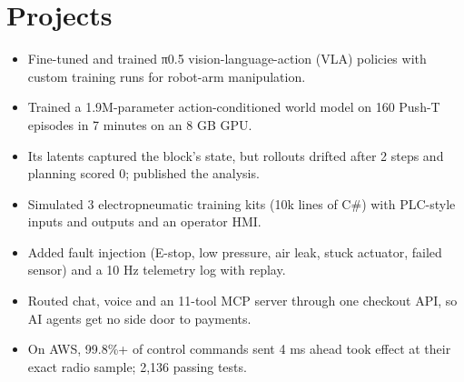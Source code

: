 \documentclass[10pt]{article}
\begin{document}
\section{Projects}
\begin{itemize}
\item Fine-tuned and trained π0.5 vision-language-action (VLA) policies with custom training runs for robot-arm manipulation.
\end{itemize}
\begin{itemize}
\item Trained a 1.9M-parameter action-conditioned world model on 160 Push-T episodes in 7 minutes on an 8 GB GPU.
\item Its latents captured the block's state, but rollouts drifted after 2 steps and planning scored 0; published the analysis.
\end{itemize}
\begin{itemize}
\item Simulated 3 electropneumatic training kits (10k lines of C\#) with PLC-style inputs and outputs and an operator HMI.
\item Added fault injection (E-stop, low pressure, air leak, stuck actuator, failed sensor) and a 10 Hz telemetry log with replay.
\end{itemize}
\begin{itemize}
\item Routed chat, voice and an 11-tool MCP server through one checkout API, so AI agents get no side door to payments.
\end{itemize}
\begin{itemize}
\item On AWS, 99.8\%+ of control commands sent 4 ms ahead took effect at their exact radio sample; 2,136 passing tests.
\end{itemize}
\end{document}
